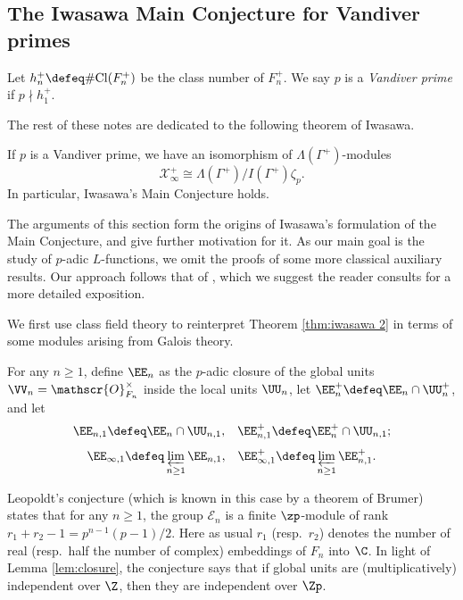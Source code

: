 \documentclass[a4paper,10pt, english, reqno]{smfart}
\newcommand{\GG}{\Gamma}
\numberwithin{equation}{section}
\begin{document}
\subsection{The Iwasawa Main Conjecture for Vandiver primes}\label{sec:vandiver proof}


\begin{definition}
	Let $h_n^+ \defeq \#\mathrm{Cl}(F_n^+)$ be the class number of $F_n^+$.  We say $p$ is a \emph{Vandiver prime} if $p \nmid h_1^+$.
\end{definition}

The rest of these notes are dedicated to the following theorem of Iwasawa.

\begin{theorem}\label{thm:vandiver}
If $p$ is a Vandiver prime, we have an isomorphism of $\Lambda(\GG^+)$-modules
\[ \mathscr{X}^+_\infty \cong \Lambda(\GG^+) / I(\GG^+) \zeta_p. \] In particular, Iwasawa's Main Conjecture holds.
\end{theorem}

The arguments of this section form the origins of Iwasawa's formulation of the Main Conjecture, and give further motivation for it. As our main goal is the study of $p$-adic $L$-functions, we omit the proofs of some more classical auxiliary results. Our approach follows that of \cite[\S4.5]{CS06}, which we suggest the reader consults for a more detailed exposition. 


We first use class field theory to reinterpret Theorem \ref{thm:iwasawa 2} in terms of some modules arising from Galois theory.

\begin{definition} For any $n \geq 1$, define $\EE_n$ as the $p$-adic closure of the global units $\VV_n = \mathscr{O}_{F_n}^\times$ inside the local units $\UU_n$, let $\EE^+_n \defeq \EE_n \cap \UU_n^+$, and let
\[ \EE_{n, 1} \defeq \EE_n \cap \UU_{n, 1}, \;\;\; \EE^+_{n, 1} \defeq \EE^+_n \cap \UU_{n, 1}; \]
\[ \EE_{\infty, 1} \defeq \varprojlim_{n \geq 1} \EE_{n, 1}, \;\;\; \EE^+_{\infty, 1} \defeq \varprojlim_{n \geq 1} \EE^+_{n, 1}. \]
\end{definition}

 Leopoldt's conjecture (which is known in this case by a theorem of Brumer) states that for any $n \geq 1$, the group $\mathscr{E}_n$ is a finite $\zp$-module of rank $r_1 + r_2 - 1 = p^{n-1} (p-1)/2$. Here as usual $r_1$  (resp.\ $r_2$) denotes the number of real  (resp.\ half the number of complex) embeddings of $F_n$ into $\C$. In light of Lemma \ref{lem:closure}, the conjecture says that if global units are (multiplicatively) independent over $\Z$, then they are independent over $\Zp$.
\end{document}

